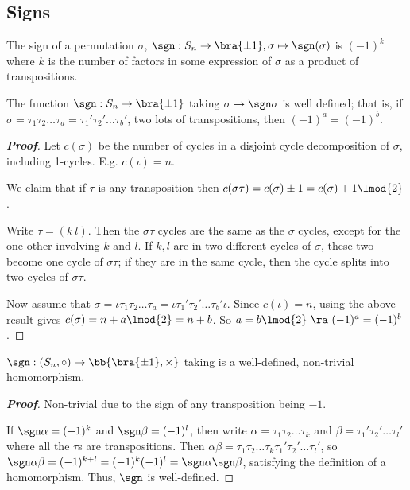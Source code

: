 \subsection{Signs}\label{subsec:sign_groups}

\begin{definition}\label{def:sign_permutation}
The sign of a permutation $\sigma$, $\sgn:S_n \to \bra{\pm 1}, \sigma\mapsto \sgn(\sigma)$ is $(-1)^k$ where $k$ is the number of factors in some expression of $\sigma$ as a product of transpositions.
\end{definition}


\begin{lemma}
The function $\sgn:S_n \to \bra{\pm 1}$ taking $\sigma \to \sgn \sigma$ is well defined; that is, if $\sigma = \tau_1 \tau_2 \dots \tau_a = \tau_1'\tau_2' \dots \tau_b'$, two lots of transpositions, then $(-1)^a = (-1)^b$.
\end{lemma}

\begin{proof}[\bf Proof]
Let $c(\sigma)$ be the number of cycles in a disjoint cycle decomposition of $\sigma$, including 1-cycles. E.g. $c(\iota) = n$.

We claim that if $\tau$ is any transposition then $c(\sigma\tau) = c(\sigma)\pm 1 = c(\sigma)+1 \lmod{2}$.

Write $\tau = (k\ l)$. Then the $\sigma \tau$ cycles are the same as the $\sigma$ cycles, except for the one other involving $k$ and $l$. If $k,l$ are in two different cycles of $\sigma$, these two become one cycle of $\sigma \tau$; if they are in the same cycle, then the cycle splits into two cycles of $\sigma \tau$.

Now assume that $\sigma = \iota \tau_1\tau_2 \dots \tau_a = \iota\tau_1' \tau_2' \dots \tau_b'\iota$. Since $c(\iota) =n$, using the above result gives $c(\sigma) = n+a\lmod{2} = n+b$. So $a = b \lmod{2} \ \ra \ (-1)^a = (-1)^b$.
\end{proof}

\begin{theorem}\label{thm:sgn_homomorphism}
$\sgn:(S_n,\circ) \to \bb{\bra{\pm 1},\times}$ taking is a well-defined, non-trivial homomorphism.
\end{theorem}

\begin{proof}[\bf Proof]
Non-trivial due to the sign of any transposition being $-1$.

If $\sgn \alpha = (-1)^k$ and $\sgn \beta = (-1)^l$, then write $\alpha = \tau_1\tau_2 \dots \tau_k$ and $\beta = \tau_1' \tau_2' \dots \tau_l'$ where all the $\tau$s are transpositions. Then $\alpha\beta = \tau_1\tau_2 \dots \tau_k \tau_1' \tau_2' \dots \tau_l'$, so $\sgn \alpha \beta = (-1)^{k+l} = (-1)^k(-1)^l = \sgn \alpha \sgn \beta$, satisfying the definition of a homomorphism. Thus, $\sgn$ is well-defined.
\end{proof}



